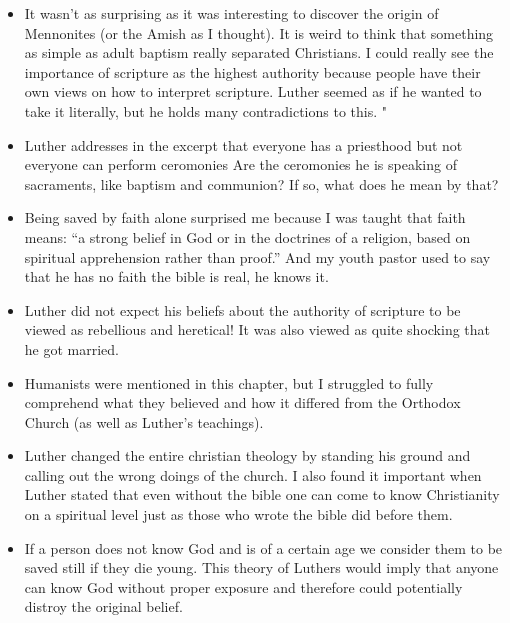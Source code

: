 \begin{frame}[label=sec-3-3]{}
\begin{itemize}
\item It wasn't as surprising as it was interesting to discover the origin of Mennonites (or the Amish as I thought). It is weird to think that something as simple as adult baptism really separated Christians. I could really see the importance of scripture as the highest authority because people have their own views on how to interpret scripture. Luther seemed as if he wanted to take it literally, but he holds many contradictions to this. "
\end{itemize}
\end{frame}

\begin{frame}[label=sec-3-4]{}
\begin{itemize}
\item Luther addresses in the excerpt that everyone has a priesthood but not everyone can perform ceromonies Are the ceromonies he is speaking of sacraments, like baptism and communion? If so, what does he mean by that?

\item Being saved by faith alone surprised me because I was taught that faith means: ``a strong belief in God or in the doctrines of a religion, based on spiritual apprehension rather than proof.'' And my youth pastor used to say that he has no faith the bible is real, he knows it.
\end{itemize}
\end{frame}

\begin{frame}[label=sec-3-5]{}
\begin{itemize}
\item Luther did not expect his beliefs about the authority of scripture to be viewed as rebellious and heretical! It was also viewed as quite shocking that he got married.

\item Humanists were mentioned in this chapter, but I struggled to fully comprehend what they believed and how it differed from the Orthodox Church (as well as Luther's teachings).
\end{itemize}
\end{frame}

\begin{frame}[label=sec-3-6]{}
\begin{itemize}
\item Luther changed the entire christian theology by standing his ground and calling out the wrong doings of the church. I also found it important when Luther stated that even without the bible one can come to know Christianity on a spiritual level just as those who wrote the bible did before them.

\item If a person does not know God and is of a certain age we consider them to be saved still if they die young. This theory of Luthers would imply that anyone can know God without proper exposure and therefore could potentially distroy the original belief.
\end{itemize}
\end{frame}

